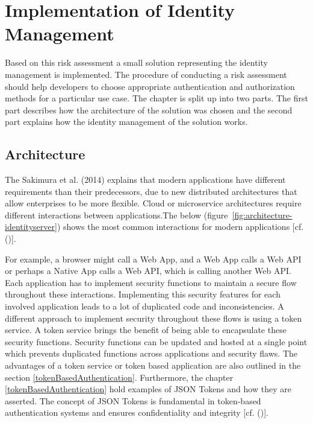 \chapter{Implementation of Identity Management}\label{chap:implementation}
\chapterstart

 Based on this risk assessment a small solution representing the identity management is implemented. The procedure of conducting a risk assessment should help developers to choose appropriate authentication and authorization methods for a particular use case. The chapter is split up into two parts. The first part describes how the architecture of the solution was chosen and the second part explains how the identity management of the solution works. 
 
 
 \section{Architecture}
 \label{architecture}
 
 The Sakimura et al. (2014) explains that modern applications have different requirements than their predecessors, due to new distributed architectures that allow enterprises to be more flexible. Cloud or microservice architectures require different interactions between applications.The below (figure~\ref{fig:architecture-identityserver}) shows the most common interactions for modern applications [cf. (\cite{Sakimura:2014:OpenIDConnect})].

 
 For example, a browser might call a Web App, and a Web App calls a Web API or perhaps a Native App calls a Web API, which is calling another Web API. Each application has to implement security functions to maintain a secure flow throughout these interactions. Implementing this security features for each involved application leads to a lot of duplicated code and inconsistencies. A different approach to implement security throughout these flows is using a token service. A token service brings the benefit of being able to encapsulate these security functions. Security functions can be updated and hosted at a single point which prevents duplicated functions across applications and security flaws. The advantages of a token service or token based application are also outlined in the section \ref{tokenBasedAuthentication}. Furthermore, the chapter \ref{tokenBasedAuthentication} hold examples of JSON Tokens and how they are asserted. The concept of JSON Tokens is fundamental in token-based authentication systems and ensures confidentiality and integrity [cf. (\cite{Sakimura:2014:OpenIDConnect})].
 
